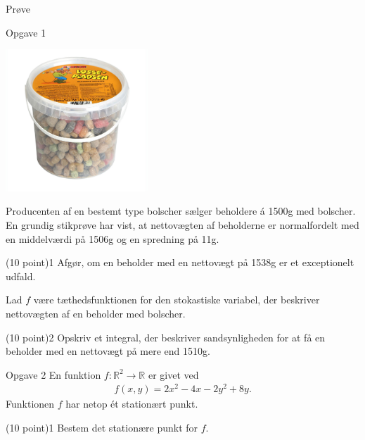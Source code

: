 \begin{center}
\LARGE
Prøve
\end{center}

\begin{opgavetekst}{Opgave 1}
	\begin{center}
		\includegraphics[width=0.4\textwidth]{Billeder/Losseplads.jpg}
	\end{center}
	Producenten af en bestemt type bolscher sælger beholdere á 1500g med bolscher. En grundig stikprøve har vist, at nettovægten af beholderne er normalfordelt med 
	en middelværdi på 1506g og en spredning på 11g. 
\end{opgavetekst}
\begin{delopgave}{(10 point)}{1}
	Afgør, om en beholder med en nettovægt på 1538g er et exceptionelt udfald. 
\end{delopgave}
\begin{meretekst}
	Lad $f$ være tæthedsfunktionen for den stokastiske variabel, der beskriver nettovægten af en beholder med bolscher.
\end{meretekst}
\begin{delopgave}{(10 point)}{2}
	Opskriv et integral, der beskriver sandsynligheden for at få en beholder med en nettovægt på mere end 1510g.
\end{delopgave}


\begin{opgavetekst}{Opgave 2}
	En funktion $f:\mathbb{R}^2 \to \mathbb{R}$ er givet ved
	\begin{align*}
		f(x,y) = 2x^2-4x-2y^2+8y.
	\end{align*}
	Funktionen $f$ har netop ét stationært punkt.
\end{opgavetekst}
\begin{delopgave}{(10 point)}{1}
	Bestem det stationære punkt for $f$. 
\end{delopgave}

